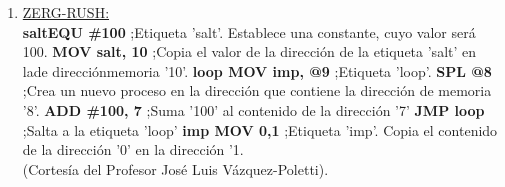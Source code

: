\begin{enumerate}
    \item \underline{ZERG-RUSH:} \\
    \newline \textbf{salt\phantom{..}EQU \#100} \phantom{.......};Etiqueta 'salt'. Establece una constante, cuyo valor será \phantom{.....................................}100.
    \newline \textbf{ \phantom{.......}MOV salt, 10} \phantom{...};Copia el valor de la dirección de la etiqueta 'salt' en la\newline \phantom{......................................}de direcciónmemoria '10'.
    \newline \textbf{loop MOV imp, @9} \phantom{.};Etiqueta 'loop'.
	\newline \textbf{\phantom{........}SPL @8} \phantom{.............};Crea un nuevo proceso en la dirección que contiene \newline \phantom{......................................}la dirección de memoria '8'.
	\newline \textbf{\phantom{........}ADD \#100, 7} \phantom{..};Suma '100' al contenido de la dirección '7'
	\newline \textbf{\phantom{........}JMP loop} \phantom{.........};Salta a la etiqueta 'loop'
    \newline \textbf{imp \phantom{.}MOV 0,1} \phantom{..........};Etiqueta 'imp'. Copia el contenido de la dirección '0' en \phantom{.....................................} la dirección '1. \\
    \newline \phantom{....................................................}(Cortesía del Profesor José Luis Vázquez-Poletti).
    
\end{enumerate}
